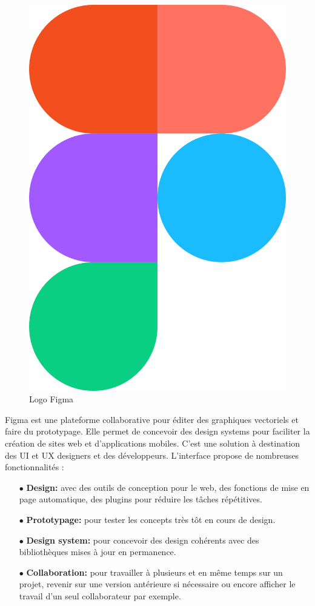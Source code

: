 \begin{figure}[H]
    \centering
    \includegraphics[scale=0.05]{Logos/Figma.png}
    \caption{Logo Figma}
\end{figure} 

Figma est une plateforme collaborative pour éditer des graphiques vectoriels et faire du prototypage. Elle permet de concevoir des design systems pour faciliter la création de sites web et d’applications mobiles. C’est une solution à destination des UI et UX designers et des développeurs. L’interface propose de nombreuses fonctionnalités :

\begin{itemize}
    \item[$\bullet$] \textbf{Design:} avec des outils de conception pour le web, des fonctions de mise en page automatique, des plugins pour réduire les tâches répétitives.
    \item[$\bullet$] \textbf{Prototypage:} pour tester les concepts très tôt en cours de design.
    \item[$\bullet$] \textbf{Design system:} pour concevoir des design cohérents avec des bibliothèques mises à jour en permanence.
    \item[$\bullet$] \textbf{Collaboration:} pour travailler à plusieurs et en même temps sur un projet, revenir sur une version antérieure si nécessaire ou encore afficher le travail d’un seul collaborateur par exemple.
\end{itemize}

